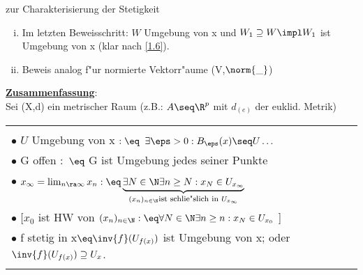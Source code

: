 \begin{bem}\label{1.15}{zur Charakterisierung der Stetigkeit}
\begin{enumerate}[(i)]
\item Im letzten Beweisschritt: $W$ Umgebung von x und $W_1\supseteq W\impl W_1$ ist\\ Umgebung von x (klar nach \ref{1.6}).
\item Beweis analog f"ur normierte Vektorr"aume (V,$\norm{\_ }$)
\end{enumerate}
\end{bem}
\ul{\bf Zusammenfassung}:\\ Sei (X,d) ein metrischer Raum (z.B.: $A\seq\R^p$ mit $d_{(e)}$ der euklid. Metrik)\\
\begin{tabular}{|l|}\hline\\
$\bullet$ $U$ Umgebung von x $:\eq$ $\exists\eps >0:B_\eps (x)\seq U\dots$\footnotemark\\
$\bullet$ G offen : $\eq$ G ist Umgebung jedes seiner Punkte\\
$\bullet$ $x_\infty = \lim_{n\ra\infty}x_n :\eq \underbrace{\exists N\in\N \exists n\geq N :x_N\in U_{x_\infty}}_{(x_n)_{n\in\N } \mbox{\footnotesize ist schlie"slich in } U_{x_\infty}}$\\
$\bullet$ $[ x_0$ ist HW von $(x_n)_{n\in\N} :\eq \forall N\in\N\exists n\geq n:x_N\in U_{x_0}$ ]\\
$\bullet$ f stetig in x$\eq \inv{f}(U_{f(x)})$ ist Umgebung von x; {\small oder} $\inv{f}(U_{f(x)})\supseteq U_x$.\\
\\\hline
\end{tabular}
\\

